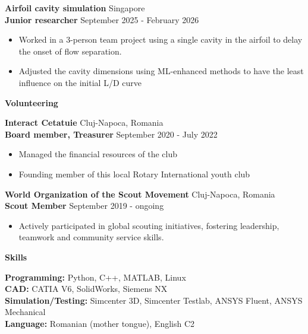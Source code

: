 \documentclass[11pt]{article}
\newcommand{\cvsection}[1]{%
  \vspace{16pt}%
  \centerline{\textbf{#1}}%
  \vspace{8pt}%
}
\newcommand{\cvrole}[4]{%
  \textbf{#1} \hfill #2 \\
  \textbf{#3} \hfill #4\par
}
\newcommand{\cvgap}{\vspace{0.7em}}
\begin{document}
\cvrole{Airfoil cavity simulation}{Singapore}{Junior researcher}{September 2025 - February 2026}
\begin{itemize}
  \item Worked in a 3-person team project using a single cavity in the airfoil to delay the onset of flow separation.
  \item Adjusted the cavity dimensions using ML-enhanced methods to have the least influence on the initial L/D curve
\end{itemize}

\cvsection{Volunteering}

\cvrole{Interact Cetatuie}{Cluj-Napoca, Romania}{Board member, Treasurer}{September 2020 - July 2022}
\begin{itemize}
  \item Managed the financial resources of the club
  \item Founding member of this local Rotary International youth club
\end{itemize}
\cvgap

\cvrole{World Organization of the Scout Movement}{Cluj-Napoca, Romania}{Scout Member}{September 2019 - ongoing}
\begin{itemize}
  \item Actively participated in global scouting initiatives, fostering leadership, teamwork and community service skills.
\end{itemize}

\vspace{-8pt}
\cvsection{Skills}

\textbf{Programming:} Python, C++, MATLAB, Linux \\
\textbf{CAD:} CATIA V6, SolidWorks, Siemens NX \\
\textbf{Simulation/Testing:} Simcenter 3D, Simcenter Testlab, ANSYS Fluent, ANSYS Mechanical \\
\textbf{Language:} Romanian (mother tongue), English C2
\end{document}
